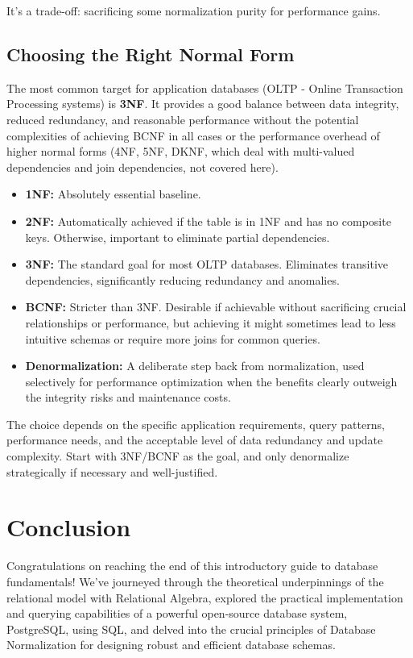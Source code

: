 \documentclass[12pt]{book}
\begin{document}
It's a trade-off: sacrificing some normalization purity for performance gains.

\section{Choosing the Right Normal Form}

The most common target for application databases (OLTP - Online Transaction Processing systems) is \textbf{3NF}. It provides a good balance between data integrity, reduced redundancy, and reasonable performance without the potential complexities of achieving BCNF in all cases or the performance overhead of higher normal forms (4NF, 5NF, DKNF, which deal with multi-valued dependencies and join dependencies, not covered here).

\begin{itemize}
    \item \textbf{1NF:} Absolutely essential baseline.
    \item \textbf{2NF:} Automatically achieved if the table is in 1NF and has no composite keys. Otherwise, important to eliminate partial dependencies.
    \item \textbf{3NF:} The standard goal for most OLTP databases. Eliminates transitive dependencies, significantly reducing redundancy and anomalies.
    \item \textbf{BCNF:} Stricter than 3NF. Desirable if achievable without sacrificing crucial relationships or performance, but achieving it might sometimes lead to less intuitive schemas or require more joins for common queries.
    \item \textbf{Denormalization:} A deliberate step back from normalization, used selectively for performance optimization when the benefits clearly outweigh the integrity risks and maintenance costs.
\end{itemize}

The choice depends on the specific application requirements, query patterns, performance needs, and the acceptable level of data redundancy and update complexity. Start with 3NF/BCNF as the goal, and only denormalize strategically if necessary and well-justified.

\chapter{Conclusion}

Congratulations on reaching the end of this introductory guide to database fundamentals! We've journeyed through the theoretical underpinnings of the relational model with Relational Algebra, explored the practical implementation and querying capabilities of a powerful open-source database system, PostgreSQL, using SQL, and delved into the crucial principles of Database Normalization for designing robust and efficient database schemas.
\end{document}
